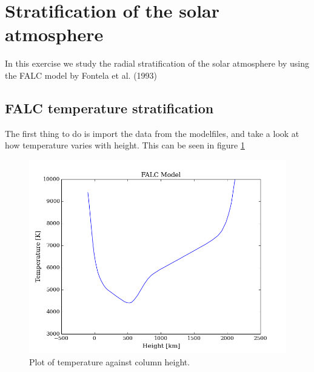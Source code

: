\documentclass{aa}   %
\begin{document}
  


\section{Stratification of the solar atmosphere}
In this exercise we study the radial stratification of the solar atmosphere by using the FALC model by Fontela et al. (1993)

\subsection{FALC temperature stratification}
The first thing to do is import the data from the modelfiles, and take a look at how temperature varies with height.
This can be seen in figure \ref{falctemp}
 \begin{figure}
  \includegraphics[width=.49\textwidth]{falctemp.png}
  \caption{Plot of temperature against column height.}
  \label{falctemp} 
 \end{figure}
\end{document}
